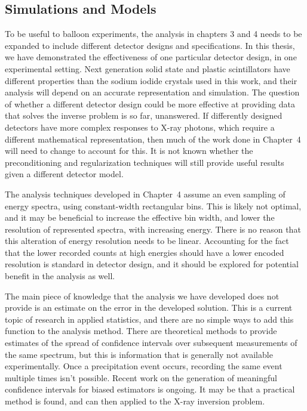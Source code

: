 \subsection{Simulations and Models}

To be useful to balloon experiments, the analysis in chapters 3 and 4 needs to be expanded to include different detector designs and specifications. In this thesis, we have demonstrated the effectiveness of one particular detector design, in one experimental setting. Next generation solid state and plastic scintillators have different properties than the sodium iodide crystals used in this work, and their analysis will depend on an accurate representation and simulation. The question of whether a different detector design could be more effective at providing data that solves the inverse problem is so far, unanswered. If differently designed detectors have more complex responses to X-ray photons, which require a different mathematical representation, then much of the work done in Chapter~4 will need to change to account for this. It is not known whether the preconditioning and regularization techniques will still provide useful results given a different detector model.

The analysis techniques developed in Chapter~4 assume an even sampling of energy spectra, using constant-width rectangular bins. This is likely not optimal, and it may be beneficial to increase the effective bin width, and lower the resolution of represented spectra, with increasing energy. There is no reason that this alteration of energy resolution needs to be linear. Accounting for the fact that the lower recorded counts at high energies should have a lower encoded resolution is standard in detector design, and it should be explored for potential benefit in the analysis as well.

The main piece of knowledge that the analysis we have developed does not provide is an estimate on the error in the developed solution. This is a current topic of research in applied statistics, and there are no simple ways to add this function to the analysis method. There are theoretical methods to provide estimates of the spread of confidence intervals over subsequent measurements of the same spectrum, but this is information that is generally not available experimentally. Once a precipitation event occurs, recording the same event multiple times isn't possible. Recent work on the generation of meaningful confidence intervals for biased estimators is ongoing. It may be that a practical method is found, and can then applied to the X-ray inversion problem. 

